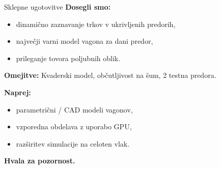 \documentclass[11pt,aspectratio=169]{beamer}
\begin{document}
\begin{frame}{Sklepne ugotovitve}
    \textbf{Dosegli smo:}
    \begin{itemize}
        \item dinamično zaznavanje trkov v ukrivljenih predorih,
        \item največji varni model vagona za dani predor,
        \item prileganje tovora poljubnih oblik.
    \end{itemize}

    \textbf{Omejitve:} Kvaderski model, občutljivost na šum, 2 testna predora.

    \textbf{Naprej:}
    \begin{itemize}
        \item parametrični / CAD modeli vagonov,
        \item vzporedna obdelava z uporabo GPU,
        \item razširitev simulacije na celoten vlak.
    \end{itemize}
\end{frame}

\begin{frame}{}
    \begin{center}
        {\Huge \textbf{Hvala za pozornost.}}
    \end{center}
\end{frame}
\end{document}
